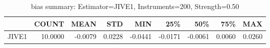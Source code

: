 \begin{table}[ht]
\centering
\caption{bias summary: Estimator=JIVE1, Instruments=200, Strength=0.50}
\begin{tabular}{lrrrrrrrr}
\toprule
 & COUNT & MEAN & STD & MIN & 25\% & 50\% & 75\% & MAX \\
\midrule
JIVE1 & 10.0000 & -0.0079 & 0.0228 & -0.0441 & -0.0171 & -0.0061 & 0.0060 & 0.0260 \\
\bottomrule
\end{tabular}
\end{table}
